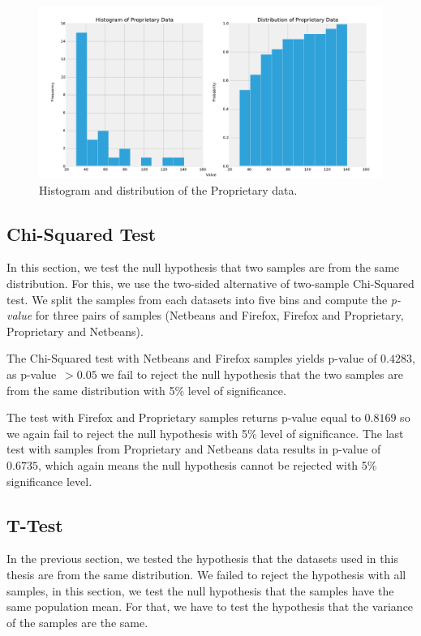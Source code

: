 \begin{figure}[htbp]
    \centering
        \includegraphics[width=\textwidth]{./images/distribution/proprietary.pdf}
    \caption{Histogram and distribution of the Proprietary data.}
    \label{fig:datasets.proprietary.dist}
\end{figure}

\subsection{Chi-Squared Test}

In this section, we test the null hypothesis that two samples are from the same distribution. For this, we use the two-sided alternative of two-sample Chi-Squared test. We split the samples from each datasets into five bins and compute the \textit{p-value} for three pairs of samples (Netbeans and Firefox, Firefox and Proprietary, Proprietary and Netbeans).

The Chi-Squared test with Netbeans and Firefox samples yields p-value of $0.4283$, as p-value~$> 0.05$ we fail to reject the null hypothesis that the two samples are from the same distribution with 5\% level of significance.

The test with Firefox and Proprietary samples returns p-value equal to $0.8169$ so we again fail to reject the null hypothesis with 5\% level of significance. The last test with samples from Proprietary and Netbeans data results in p-value of $0.6735$, which again means the null hypothesis cannot be rejected with 5\% significance level.

\subsection{T-Test}

In the previous section, we tested the hypothesis that the datasets used in this thesis are from the same distribution. We failed to reject the hypothesis with all samples, in this section, we test the null hypothesis that the samples have the same population mean. For that, we have to test the hypothesis that the variance of the samples are the same.


